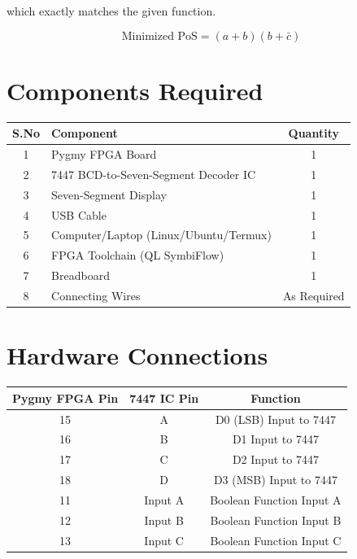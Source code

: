 \documentclass[12pt,a4paper]{article}
\begin{document}
which exactly matches the given function.

$$
\boxed{\text{Minimized PoS}=(a+b)(b+\bar{c})}
$$
\section*{Components Required}

\begin{center}
\begin{tabular}{|c|l|c|}
\hline
\textbf{S.No} & \textbf{Component} & \textbf{Quantity} \\
\hline
1 & Pygmy FPGA Board & 1 \\
\hline
2 & 7447 BCD-to-Seven-Segment Decoder IC & 1 \\
\hline
3 & Seven-Segment Display & 1 \\
\hline
4 & USB Cable & 1 \\
\hline
5 & Computer/Laptop (Linux/Ubuntu/Termux) & 1 \\
\hline
6 & FPGA Toolchain (QL SymbiFlow) & 1 \\
\hline
7 & Breadboard & 1 \\
\hline
8 & Connecting Wires & As Required \\
\hline

\end{tabular}
\end{center}
\section*{Hardware Connections}

\begin{center}
\begin{tabular}{|c|c|c|}
\hline
\textbf{Pygmy FPGA Pin} & \textbf{7447 IC Pin} & \textbf{Function} \\
\hline
15 & A & D0 (LSB) Input to 7447 \\
\hline
16 & B & D1 Input to 7447 \\
\hline
17 & C & D2 Input to 7447 \\
\hline
18 & D & D3 (MSB) Input to 7447 \\
\hline
11 & Input A & Boolean Function Input A \\
\hline
12 & Input B & Boolean Function Input B \\
\hline
13 & Input C & Boolean Function Input C \\
\hline
\end{tabular}
\end{center}
\end{document}
